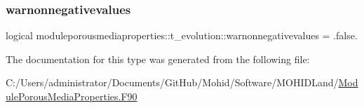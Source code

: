\mbox{\label{structmoduleporousmediaproperties_1_1t__evolution_a483040e900d69ebfabe56032d8b8c9c1}} 
\subsubsection{\texorpdfstring{warnonnegativevalues}{warnonnegativevalues}}
{\footnotesize\ttfamily logical moduleporousmediaproperties\+::t\+\_\+evolution\+::warnonnegativevalues = .false.\hspace{0.3cm}{\ttfamily [private]}}



The documentation for this type was generated from the following file\+:\begin{DoxyCompactItemize}
\item 
C\+:/\+Users/administrator/\+Documents/\+Git\+Hub/\+Mohid/\+Software/\+M\+O\+H\+I\+D\+Land/\mbox{\hyperlink{_module_porous_media_properties_8_f90}{Module\+Porous\+Media\+Properties.\+F90}}\end{DoxyCompactItemize}
